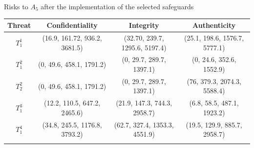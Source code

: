\begin{stripedtable}[htb]
	\centering
	\caption{Risks to $A_5$ after the implementation of the selected safeguards}
	\label{table:risk}
	\begin{scriptsize}
	\begin{tabular}{cccc}
		\toprule
		\hiderowcolors
		Threat & Confidentiality & Integrity & Authenticity \\
		\midrule
		\showrowcolors
		$T_{1}^{1}$ & (16.9, 161.72, 936.2, 3681.5) & (32.70, 239.7, 1295.6, 5197.4) & (25.1, 198.6, 1576.7, 5777.1)\\
		$T_{1}^{2}$ & (0, 49.6, 458.1, 1791.2) & (0, 29.7, 289.7, 1397.1) & (0, 24.6, 352.6, 1552.9)\\
		$T_{2}^{2}$ & (0, 49.6, 458.1, 1791.2) & (0, 29.7, 289.7, 1397.1) & (76, 379.3, 2074.3, 5588.4)\\
		$T_{1}^{3}$ & (12.2, 110.5, 647.2, 2465.6) & (21.9, 147.3, 744.3, 2958.7) & (6.8, 58.5, 487.1, 1923.2)\\ 
		$T_{1}^{4}$ & (34.8, 245.5, 1176.8, 3793.2) & (62.7, 327.4, 1353.3, 4551.9) & (19.5, 129.9, 885.7, 2958.7)\\
		\bottomrule
		\hiderowcolors
	\end{tabular}
	\end{scriptsize}
\end{stripedtable}